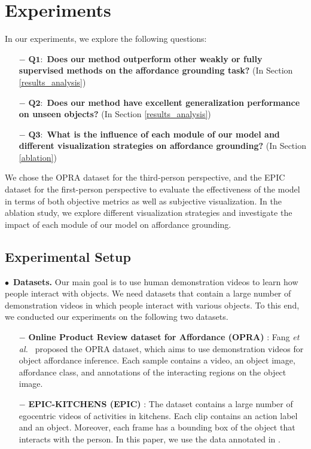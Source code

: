 \documentclass[journal,twoside]{IEEEtran}
\newcommand{\myPara}[1]{\vspace{5pt}\noindent$\bullet$~\textbf{#1} \quad}
\def\etal{{\em et al.~}}
\begin{document}
\section{Experiments}
In our experiments, we explore the following questions: 
\begin{itemize}
    \item [$\bm{-}$]
    $\bm{Q1:}$ \textbf{Does our method outperform other weakly or fully supervised methods on the affordance grounding task?} (In Section \ref{results_analysis})
    \item [$\bm{-}$]
    $\bm{Q2:}$ \textbf{Does our method have excellent generalization performance on unseen objects?} (In Section \ref{results_analysis})
    \item [$\bm{-}$]
    $\bm{Q3:}$ \textbf{What is the influence of each module of our model and different visualization strategies on affordance grounding?} (In Section \ref{ablation})
\end{itemize}
\par We chose the OPRA \cite{demo2vec2018cvpr} dataset for the third-person perspective, and the EPIC \cite{Damen2018EPICKITCHENS} dataset for the first-person perspective to evaluate the effectiveness of the model in terms of both objective metrics as well as subjective visualization. In the ablation study, we explore different visualization strategies and investigate the impact of each module of our model on affordance grounding.

\subsection{Experimental Setup}

\myPara{Datasets.}
Our main goal is to use human demonstration videos to learn how people interact with objects. We need datasets that contain a large number of demonstration videos in which people interact with various objects. To this end, we conducted our experiments on the following two datasets.

\begin{itemize}

\item [$\bm{-}$] 
\textbf{Online Product Review dataset for Affordance (OPRA)} \cite{demo2vec2018cvpr}: Fang \etal \cite{demo2vec2018cvpr} proposed the OPRA dataset, which aims to use demonstration videos for object affordance inference. Each sample contains a video, an object image, affordance class, and annotations of the interacting regions on the object image.

\item [$\bm{-}$] 
\textbf{EPIC-KITCHENS (EPIC)} \cite{Damen2018EPICKITCHENS}: The dataset contains a large number of egocentric videos of activities in kitchens. Each clip contains an action label and an object. Moreover, each frame has a bounding box of the object that interacts with the person. In this paper, we use the data annotated in \cite{interaction-hotspots}.

\end{itemize}
\end{document}
